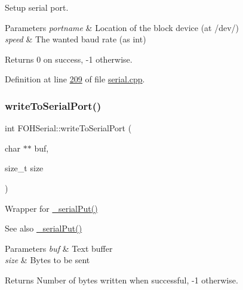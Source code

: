 Setup serial port. 


\begin{DoxyParams}{Parameters}
{\em portname} & Location of the block device (at /dev/) \\
\hline
{\em speed} & The wanted baud rate (as int)\\
\hline
\end{DoxyParams}
\begin{DoxyReturn}{Returns}
0 on success, -\/1 otherwise. 
\end{DoxyReturn}


Definition at line \mbox{\hyperlink{serial_8cpp_source_l00209}{209}} of file \mbox{\hyperlink{serial_8cpp_source}{serial.\+cpp}}.

\mbox{\label{classFOHSerial_a6bb54e84682142525b9a24a122157234}} 
\subsubsection{\texorpdfstring{write\+To\+Serial\+Port()}{writeToSerialPort()}}
{\footnotesize\ttfamily int F\+O\+H\+Serial\+::write\+To\+Serial\+Port (\begin{DoxyParamCaption}\item[{char $\ast$$\ast$}]{buf,  }\item[{size\+\_\+t}]{size }\end{DoxyParamCaption})}



Wrapper for \mbox{\hyperlink{classFOHSerial_add9b2e556b56459b2eddc9b71f5c80ed}{\+\_\+serial\+Put()}} 

\begin{DoxySeeAlso}{See also}
\mbox{\hyperlink{classFOHSerial_add9b2e556b56459b2eddc9b71f5c80ed}{\+\_\+serial\+Put()}}
\end{DoxySeeAlso}

\begin{DoxyParams}{Parameters}
{\em buf} & Text buffer \\
\hline
{\em size} & Bytes to be sent\\
\hline
\end{DoxyParams}
\begin{DoxyReturn}{Returns}
Number of bytes written when successful, -\/1 otherwise.
\end{DoxyReturn}

